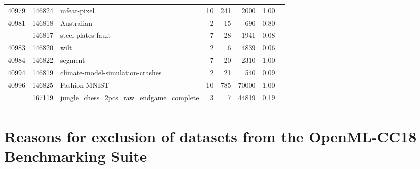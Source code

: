 \documentclass[twoside,11pt]{article}
\begin{document}
\begin{table}[h]
\begin{adjustbox}{center, width=7.75cm, totalheight=12cm}
\begin{tabular}{rrlrrrrr}
40979 & 146824 & mfeat-pixel & 10 & 241 & 2000 & 1.00\\
40981 & 146818 & Australian & 2 & 15 & 690 & 0.80\\
\addlinespace
40982 & 146817 & steel-plates-fault & 7 & 28 & 1941 & 0.08\\
40983 & 146820 & wilt & 2 & 6 & 4839 & 0.06\\
40984 & 146822 & segment & 7 & 20 & 2310 & 1.00\\
40994 & 146819 & climate-model-simulation-crashes & 2 & 21 & 540 & 0.09\\
40996 & 146825 & Fashion-MNIST & 10 & 785 & 70000 & 1.00\\
\addlinespace
41027 & 167119 & jungle\_chess\_2pcs\_raw\_endgame\_complete & 3 & 7 & 44819 & 0.19\\


 &  &  &  &  &  & \\


\bottomrule
\end{tabular}
\end{adjustbox}
\end{table}

\newpage
\section{Reasons for exclusion of datasets from the OpenML-CC18 Benchmarking Suite} 
\label{app:datasets2}

\end{document}
